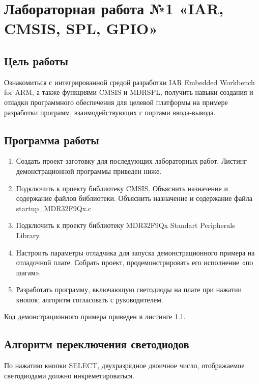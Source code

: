 \documentclass[14pt,a4paper,report]{report}
\begin{document}
\chapter {Лабораторная работа №1 «IAR, CMSIS, SPL, GPIO»}

\section {Цель работы}

Ознакомиться с интегрированной средой разработки IAR Embedded Workbench for ARM, а также функциями CMSIS и MDRSPL, получить навыки создания и отладки программного обеспечения для целевой платформы на примере разработки программ, взаимодействующих с портами ввода-вывода.

\section{Программа работы}

\begin{enumerate}
	\item Создать проект-заготовку для последующих лабораторных работ. Листинг демонстрационной программы приведен ниже.
	\item Подключить к проекту библиотеку CMSIS. Объяснить назначение и содержание файлов библиотеки. Объяснить назначение и содержание файла startup\_MDR32F9Qx.c
	\item Подключить к проекту библиотеку MDR32F9Qx Standart Peripherals Library.
	\item Настроить параметры отладчика для запуска демонстрационного примера на отладочной плате. Собрать проект, продемонстрировать его исполнение «по шагам».
	\item Разработать программу, включающую светодиоды на плате при нажатии кнопок; алгоритм согласовать с руководителем.
\end{enumerate}

Код демонстрационного примера приведен в листинге 1.1.



\section{Алгоритм переключения светодиодов}

По нажатию кнопки SELECT, двухразрядное двоичное число, отображаемое светодиодами должно инкреметироваться. 
\end{document}
